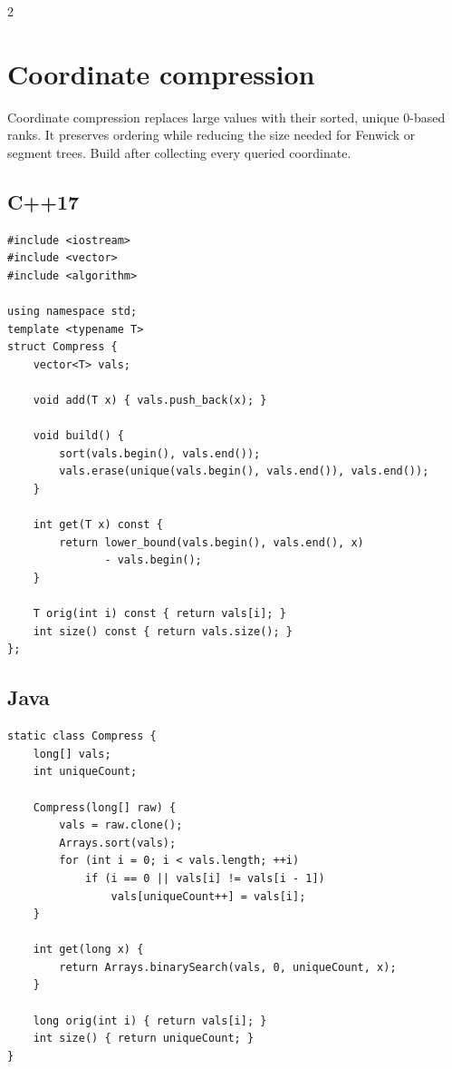 \documentclass[10pt]{article}
\begin{document}
\begin{multicols}{2}

\section{Coordinate compression}
Coordinate compression replaces large values with their sorted, unique
0-based ranks. It preserves ordering while reducing the size needed for
Fenwick or segment trees. Build after collecting every queried coordinate.

\subsection{C++17}
\begin{framed}
\scriptsize
\begin{verbatim}
#include <iostream>
#include <vector>
#include <algorithm>

using namespace std;
template <typename T>
struct Compress {
    vector<T> vals;

    void add(T x) { vals.push_back(x); }

    void build() {
        sort(vals.begin(), vals.end());
        vals.erase(unique(vals.begin(), vals.end()), vals.end());
    }

    int get(T x) const {
        return lower_bound(vals.begin(), vals.end(), x)
               - vals.begin();
    }

    T orig(int i) const { return vals[i]; }
    int size() const { return vals.size(); }
};
\end{verbatim}
\end{framed}

\subsection{Java}
\begin{framed}
\scriptsize
\begin{verbatim}
static class Compress {
    long[] vals;
    int uniqueCount;

    Compress(long[] raw) {
        vals = raw.clone();
        Arrays.sort(vals);
        for (int i = 0; i < vals.length; ++i)
            if (i == 0 || vals[i] != vals[i - 1])
                vals[uniqueCount++] = vals[i];
    }

    int get(long x) {
        return Arrays.binarySearch(vals, 0, uniqueCount, x);
    }

    long orig(int i) { return vals[i]; }
    int size() { return uniqueCount; }
}
\end{verbatim}
\end{framed}


\end{multicols}
\end{document}
